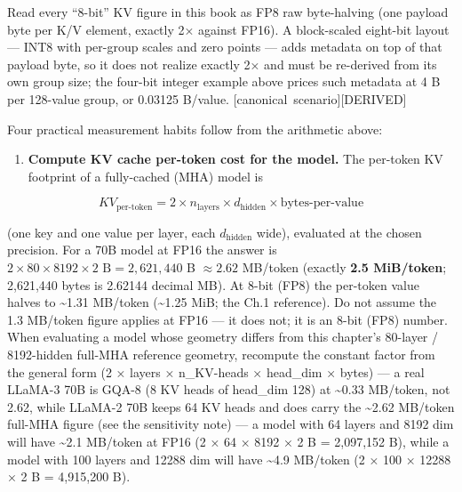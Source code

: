 Read every ``8-bit'' KV figure in this book as FP8 raw byte-halving (one
payload byte per K/V element, exactly 2× against FP16). A block-scaled
eight-bit layout --- INT8 with per-group scales and zero points --- adds
metadata on top of that payload byte, so it does not realize exactly 2×
and must be re-derived from its own group size; the four-bit integer
example above prices such metadata at 4 B per 128-value group, or
0.03125 B/value. \mbox{{[}canonical scenario{]}}\hspace{0pt}\mbox{{[}DERIVED{]}}

\label{measurement}


Four practical measurement habits follow from the arithmetic above:

\begin{enumerate}
\def\labelenumi{\arabic{enumi}.}
\tightlist
\item
  \textbf{Compute KV cache per-token cost for the model.} The per-token
  KV footprint of a fully-cached (MHA) model is
\end{enumerate}

\[
KV_{\text{per-token}} = 2 \times n_\text{layers} \times d_\text{hidden} \times \text{bytes-per-value}
\]

(one key and one value per layer, each \(d_\text{hidden}\) wide),
evaluated at the chosen precision. For a 70B model at FP16 the answer is
\(2 \times 80 \times 8192 \times 2 \text{ B} = 2{,}621{,}440\) B
\(\approx 2.62\) MB/token (exactly \textbf{2.5 MiB/token}; 2,621,440
bytes is 2.62144 decimal MB). At 8-bit (FP8) the per-token value halves
to \textasciitilde1.31 MB/token (\textasciitilde1.25 MiB; the Ch.1
reference). Do not assume the 1.3 MB/token figure applies at FP16 --- it
does not; it is an 8-bit (FP8) number. When evaluating a model whose
geometry differs from this chapter's 80-layer / 8192-hidden full-MHA
reference geometry, recompute the constant factor from the general form
(2 × layers × n\_KV-heads × head\_dim × bytes) --- a real LLaMA-3 70B is
GQA-8 (8 KV heads of head\_dim 128) at \textasciitilde0.33 MB/token, not
2.62, while LLaMA-2 70B keeps 64 KV heads and does carry the
\textasciitilde2.62 MB/token full-MHA figure (see the sensitivity note)
--- a model with 64 layers and 8192 dim will have \textasciitilde2.1
MB/token at FP16 (2 × 64 × 8192 × 2 B = 2,097,152 B), while a model with
100 layers and 12288 dim will have \textasciitilde4.9 MB/token (2 × 100
× 12288 × 2 B = 4,915,200 B).

